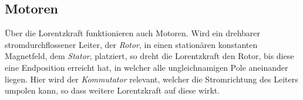 \documentclass{article}
\begin{document}
\subsection{Motoren}
Über die Lorentzkraft funktionieren auch Motoren. Wird ein drehbarer stromdurchflossener Leiter, der \emph{Rotor}, in einen stationären konstanten Magnetfeld, dem \emph{Stator}, platziert, so dreht die Lorentzkraft den Rotor, bis diese eine Endposition erreicht hat, in welcher alle ungleichnamigen Pole aneinander liegen. Hier wird der \emph{Kommutator} relevant, welcher die Stromrichtung des Leiters umpolen kann, so dass weitere Lorentzkraft auf diese wirkt.
 
\end{document}
